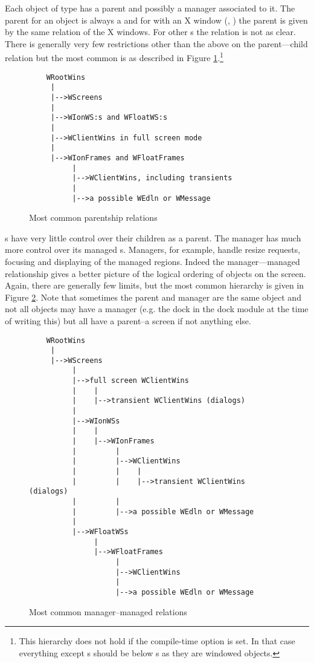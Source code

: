 
Each object of type  has a parent and possibly a manager
associated to it. The parent for an object is always a 
 and for  with an X window (,
) the parent  is given by the same relation of
the X windows. For other s the relation is not as clear.
There is generally very few restrictions other than the above on the
parent---child relation but the most common is as described in
Figure \ref{fig:parentship}.\footnote{This hierarchy does not hold
  if the compile-time option  is set. In that
  case everything except s  should be below s
  as they are windowed objects.}

\begin{figure}
\begin{verbatim}
    WRootWins
     |
     |-->WScreens
     |
     |-->WIonWS:s and WFloatWS:s
     |
     |-->WClientWins in full screen mode
     |
     |-->WIonFrames and WFloatFrames
          |
          |-->WClientWins, including transients
          |
          |-->a possible WEdln or WMessage
\end{verbatim}
\caption{Most common parentship relations}
\label{fig:parentship}
\end{figure}

s have very little control over their children as a parent.
The manager  has much more control over its
managed s. Managers, for example, handle resize requests,
focusing and displaying of the managed regions. Indeed the manager---managed
relationship gives a better picture of the logical ordering of objects on
the screen. Again, there are generally few limits, but the most common
hierarchy is given in Figure \ref{fig:managership}. Note that sometimes
the parent and manager are the same object and not all objects may have
a manager (e.g. the dock in the dock module at the time of writing this)
but all have a parent--a screen if not anything else.

\begin{figure}
\begin{verbatim}
    WRootWins
     |
     |-->WScreens
          |
          |-->full screen WClientWins
          |    |
          |    |-->transient WClientWins (dialogs)
          |
          |-->WIonWSs
          |    |
          |    |-->WIonFrames
          |         |
          |         |-->WClientWins
          |         |    |
          |         |    |-->transient WClientWins (dialogs)
          |         |
          |         |-->a possible WEdln or WMessage
          |
          |-->WFloatWSs
               |
               |-->WFloatFrames
                    |
                    |-->WClientWins
                    |
                    |-->a possible WEdln or WMessage
\end{verbatim}
\caption{Most common manager--managed relations}
\label{fig:managership}
\end{figure}

